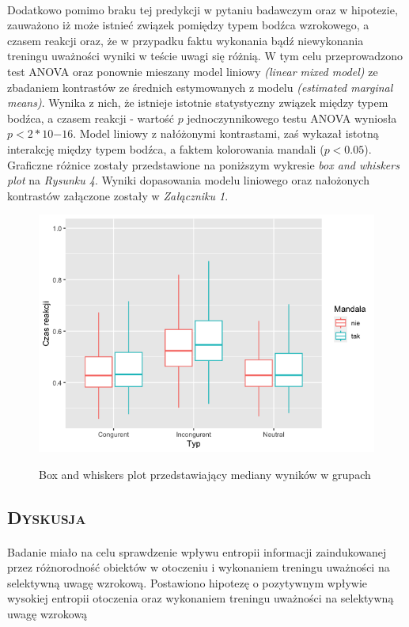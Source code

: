 \documentclass[12pt,a4paper,final,oneside,onecolumn,titlepage]{article}
\begin{document}
\paragraph{}
Dodatkowo pomimo braku tej predykcji w pytaniu badawczym oraz w hipotezie, zauważono iż może istnieć związek pomiędzy typem bodźca wzrokowego, a czasem reakcji oraz, że w przypadku faktu wykonania bądź niewykonania treningu uważności wyniki w teście uwagi się różnią. W tym celu przeprowadzono test ANOVA oraz ponownie mieszany model liniowy \textit{(linear mixed model)} ze zbadaniem kontrastów ze średnich estymowanych z modelu \textit{(estimated marginal means)}. Wynika z nich, że istnieje istotnie statystyczny związek między typem bodźca, a czasem reakcji - wartość $p$ jednoczynnikowego testu ANOVA wyniosła $p<2*10{-16}$. Model liniowy z nałóżonymi kontrastami, zaś wykazał istotną interakcję między typem bodźca, a faktem kolorowania mandali ($p<0.05$). Graficzne różnice zostały przedstawione na poniższym wykresie \textit{box and whiskers plot} na \textit{Rysunku 4}. Wyniki dopasowania modelu liniowego oraz nałożonych kontrastów załączone zostały w \textit{Załączniku 1}.
\begin{figure}[H]
\centering
\caption{Box and whiskers plot przedstawiający mediany wyników w grupach}
\includegraphics[scale=0.5]{box2}
\label{Rysunek}
\end{figure}
\begin{center}
\section*{\large{\textbf{\textsc{Dyskusja}}}}
\end{center}
\paragraph{}
Badanie miało na celu sprawdzenie wpływu entropii informacji zaindukowanej przez różnorodność obiektów w otoczeniu i wykonaniem treningu uważności na selektywną uwagę wzrokową. Postawiono hipotezę o pozytywnym wpływie wysokiej entropii otoczenia oraz wykonaniem treningu uważności na selektywną uwagę wzrokową
\newpage

\end{document}

